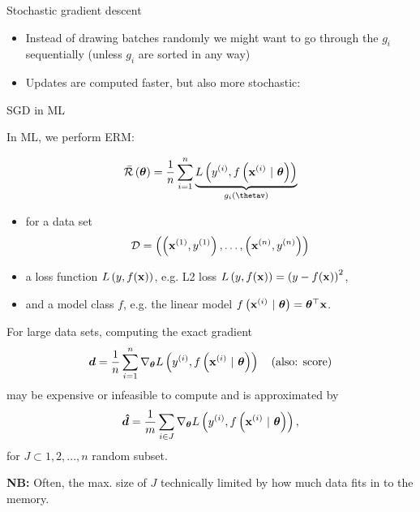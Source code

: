 \documentclass[11pt,compress,t,notes=noshow, xcolor=table]{beamer}
\begin{document}
\begin{vbframe}{Stochastic gradient descent}
\begin{footnotesize}
	\begin{itemize}
		\item Instead of drawing batches randomly we might want to go through the $g_i$ sequentially (unless $g_i$ are sorted in any way)
		\item Updates are computed faster, but also more stochastic: 
		\begin{itemize} 
		\end{itemize} 
	\end{itemize}
\end{footnotesize}

\end{vbframe}

\begin{vbframe}{SGD in ML}

	In ML, we perform ERM:  

	$$
		\bar \risk\left(\thetab\right) = \frac{1}{n}\sumin \underbrace{\Lxyit}_{g_i(\thetav)}
	$$

	\begin{itemize}
		\item for a data set 
		$$\mathcal{D} = \left( \left(\mathbf{x}^{(1)}, y^{(1)}\right), \ldots, \left(\mathbf{x}^{(n)}, y^{(n)}\right)\right)$$
		\item a loss function $L\left(y, f(\mathbf{x})\right)$,
		e.g. L2 loss $L\left(y, f(\mathbf{x})\right) = \left(y - f(\mathbf{x})\right)^2$,
		\item and a model class $f$, e.g. the linear model $f\left(\mathbf{x}^{(i)} ~|~ \bm{\theta}\right) = \bm{\theta}^\top \mathbf{x}$. 
	\end{itemize}

	\framebreak 

	For large data sets, computing the exact gradient 
	$$
		\bm{d} = \frac{1}{n}\sum_{i=1}^n \nabla_{\bm{\theta}} L\left(y^{(i)}, f\left(\mathbf{x}^{(i)} ~|~ \bm{\theta}\right)\right) \quad \text{(also: score)}
	$$ 
	may be expensive or infeasible to compute and is approximated by 
	$$
	\bm{\hat d} = \frac{1}{m}\sum_{i \in J} \nabla_{\bm{\theta}} L\left(y^{(i)}, f\left(\mathbf{x}^{(i)} ~|~ \bm{\theta}\right)\right),
	$$
        for $J \subset{1, 2, ..., n}$ random subset. 

        \lz 
        
	\textbf{NB:} Often, the max. size of $J$ technically limited by how much data fits in to the memory. 
\end{vbframe}
\end{document}
